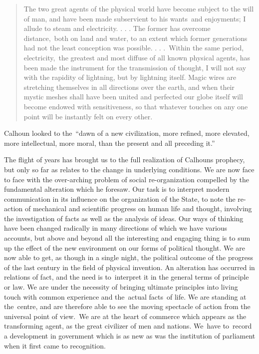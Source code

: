 \documentclass[openany,nobib]{tufte-book}
\begin{document}
\begin{quote}
The two great agents of the physical world have become subject to the
will of man, and have been made subservient to his wants~and enjoyments;
I allude to steam and electricity. . . . The former has overcome
distance,~both on land and water, to an extent which former generations
had not the least conception was possible. . . .~Within the same period,
electricity,~the greatest and most diffuse of all known physical agents,
has been made the instrument for the transmission of thought, I will not
say with the rapidity of lightning, but by lightning itself. Magic wires
are stretching themselves in all directions over the earth, and when
their mystic meshes shall have been united and perfected our globe
itself will become endowed with sensitiveness, so that whatever touches
on any one point will be instantly felt on every other.~
\end{quote}

\noindent Calhoun looked to the~``dawn of a new civilization, more refined, more
elevated, more intellectual, more moral, than the present and all
preceding it.''

The flight of years has brought us to the full realization of
Calhoun\textquotesingle s prophecy, but only so far as relates to the
change in underlying conditions. We are now face to face with the
over-arching problem of social re-organization compelled by the
fundamental alteration which he foresaw. Our task is to interpret modern
communication in its influence on the organization of the State, to note
the re-action of mechanical and scientific progress on human life and
thought, involving the investigation of facts as well as the analysis of
ideas. Our ways of thinking have been changed radically in many
directions of which we have various accounts, but above and beyond all
the interesting and engaging thing is to sum up the effect of the new
environment on our forms of political thought. We are now able to get,
as though in a single night, the political outcome of the progress of
the last century in the field of physical invention. An alteration has
occurred in relations of fact, and the need is to~interpret it in the
general terms of principle or law. We are under the necessity of
bringing ultimate principles into living touch with common experience
and the~actual facts~of life. We are standing at the~centre, and are
therefore able to see the moving spectacle of action from the universal
point of view.~We are at the heart of commerce which appears as the
transforming agent, as the great civilizer of men and nations. We~have
to~record a development in government which is as new as was the
institution of parliament when it first came to recognition.~
\end{document}
